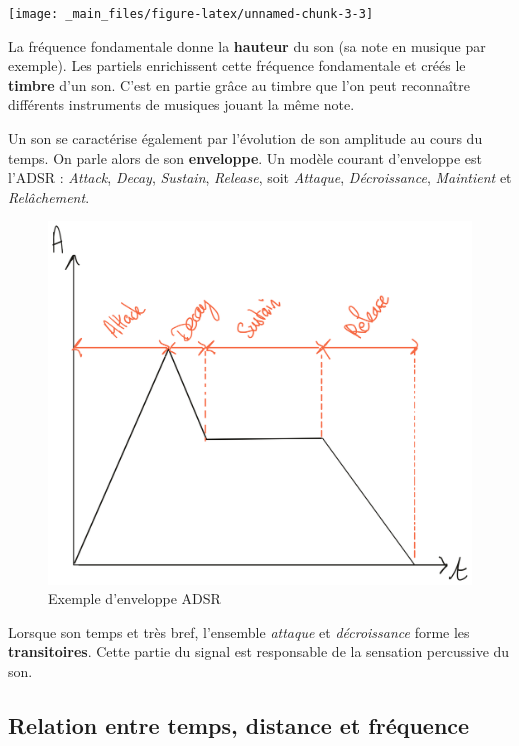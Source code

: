 \documentclass[
]{book}
\begin{document}
\begin{center}\texttt{[image: \_main\_files/figure-latex/unnamed-chunk-3-3]} \end{center}

La fréquence fondamentale donne la \textbf{hauteur} du son (sa note en musique par exemple). Les partiels enrichissent cette fréquence fondamentale et créés le \textbf{timbre} d'un son. C'est en partie grâce au timbre que l'on peut reconnaître différents instruments de musiques jouant la même note.

Un son se caractérise également par l'évolution de son amplitude au cours du temps. On parle alors de son \textbf{enveloppe}. Un modèle courant d'enveloppe est l'ADSR : \emph{Attack}, \emph{Decay}, \emph{Sustain}, \emph{Release}, soit \emph{Attaque}, \emph{Décroissance}, \emph{Maintient} et \emph{Relâchement}.

\begin{figure}

{\centering \includegraphics[width=0.65\linewidth]{_resources/drawings/adsr} 

}

\caption{Exemple d'enveloppe ADSR}\label{fig:unnamed-chunk-4}
\end{figure}

Lorsque son temps et très bref, l'ensemble \emph{attaque} et \emph{décroissance} forme les \textbf{transitoires}. Cette partie du signal est responsable de la sensation percussive du son.

\hypertarget{relation-entre-temps-distance-et-fruxe9quence}{%
\subsection{Relation entre temps, distance et fréquence}\label{relation-entre-temps-distance-et-fruxe9quence}}
\end{document}
